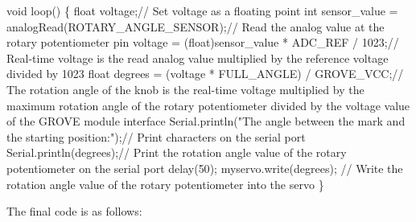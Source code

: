 \documentclass[
  letterpaper,
  DIV=11,
  numbers=noendperiod]{scrreprt}
\newenvironment{Shaded}{\begin{snugshade}}{\end{snugshade}}
\newcommand{\CommentTok}[1]{\textcolor[rgb]{0.37,0.37,0.37}{#1}}
\newcommand{\DataTypeTok}[1]{\textcolor[rgb]{0.68,0.00,0.00}{#1}}
\newcommand{\DecValTok}[1]{\textcolor[rgb]{0.68,0.00,0.00}{#1}}
\newcommand{\NormalTok}[1]{\textcolor[rgb]{0.00,0.23,0.31}{#1}}
\newcommand{\OperatorTok}[1]{\textcolor[rgb]{0.37,0.37,0.37}{#1}}
\newcommand{\StringTok}[1]{\textcolor[rgb]{0.13,0.47,0.30}{#1}}
\begin{document}
\begin{Shaded}
\begin{Highlighting}[]
\DataTypeTok{void}\NormalTok{ loop}\OperatorTok{()} \OperatorTok{\{}
    \DataTypeTok{float}\NormalTok{ voltage}\OperatorTok{;}\CommentTok{// Set voltage as a floating point}
    \DataTypeTok{int}\NormalTok{ sensor\_value }\OperatorTok{=}\NormalTok{ analogRead}\OperatorTok{(}\NormalTok{ROTARY\_ANGLE\_SENSOR}\OperatorTok{);}\CommentTok{// Read the analog value at the rotary potentiometer pin}
\NormalTok{    voltage }\OperatorTok{=} \OperatorTok{(}\DataTypeTok{float}\OperatorTok{)}\NormalTok{sensor\_value }\OperatorTok{*}\NormalTok{ ADC\_REF }\OperatorTok{/} \DecValTok{1023}\OperatorTok{;}\CommentTok{// Real{-}time voltage is the read analog value multiplied by the reference voltage divided by 1023}
    \DataTypeTok{float}\NormalTok{ degrees }\OperatorTok{=} \OperatorTok{(}\NormalTok{voltage }\OperatorTok{*}\NormalTok{ FULL\_ANGLE}\OperatorTok{)} \OperatorTok{/}\NormalTok{ GROVE\_VCC}\OperatorTok{;}\CommentTok{// The rotation angle of the knob is the real{-}time voltage multiplied by the maximum rotation angle of the rotary potentiometer divided by the voltage value of the GROVE module interface}
\NormalTok{    Serial}\OperatorTok{.}\NormalTok{println}\OperatorTok{(}\StringTok{"The angle between the mark and the starting position:"}\OperatorTok{);}\CommentTok{// Print characters on the serial port}
\NormalTok{    Serial}\OperatorTok{.}\NormalTok{println}\OperatorTok{(}\NormalTok{degrees}\OperatorTok{);}\CommentTok{// Print the rotation angle value of the rotary potentiometer on the serial port}
\NormalTok{    delay}\OperatorTok{(}\DecValTok{50}\OperatorTok{);}
\NormalTok{    myservo}\OperatorTok{.}\NormalTok{write}\OperatorTok{(}\NormalTok{degrees}\OperatorTok{);} \CommentTok{// Write the rotation angle value of the rotary potentiometer into the servo}
\OperatorTok{\}}
\end{Highlighting}
\end{Shaded}

The final code is as follows:
\end{document}
